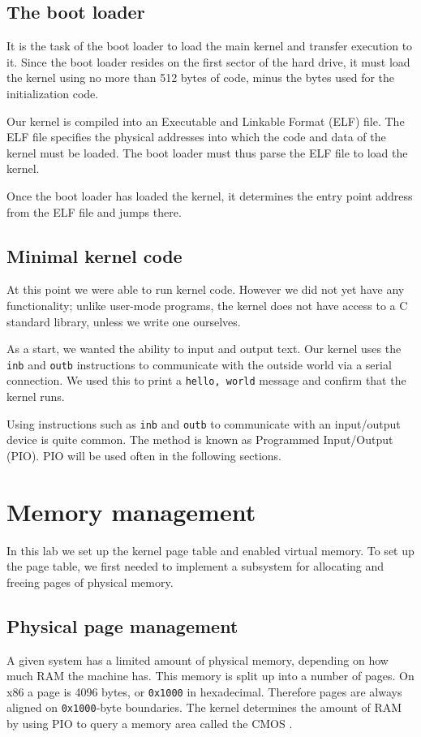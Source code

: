 \documentclass{report}
\begin{document}
\section{The boot loader}
It is the task of the boot loader to load the main kernel and transfer
execution to it. Since the boot loader resides on the first sector of the hard
drive, it must load the kernel using no more than 512 bytes of code, minus the
bytes used for the initialization code.

Our kernel is compiled into an Executable and Linkable Format (ELF) file. The
ELF file specifies the physical addresses into which the code and data of the
kernel must be loaded. The boot loader must thus parse the ELF file to load
the kernel.

Once the boot loader has loaded the kernel, it determines the entry point
address from the ELF file and jumps there.


\section{Minimal kernel code}
At this point we were able to run kernel code. However we did not yet have any
functionality; unlike user-mode programs, the kernel does not have access to a
C standard library, unless we write one ourselves.

As a start, we wanted the ability to input and output text.
Our kernel uses the \texttt{inb} and \texttt{outb} instructions to
communicate with the outside world via a serial connection. We used this to
print a \texttt{hello, world} message and confirm that the kernel runs.

Using instructions such as \texttt{inb} and \texttt{outb} to communicate with
an input/output device is quite common. The method is known as Programmed
Input/Output (PIO). PIO will be used often in the following sections.



\chapter{Memory management}
\label{sec:mem}
In this lab we set up the kernel page table and enabled virtual memory. To set up the
page table, we first needed to implement a subsystem for allocating and
freeing pages of physical memory.


\section{Physical page management}
A given system has a limited amount of physical memory, depending on how much
RAM the machine has. This memory is split up into a number of pages. On x86 a
page is 4096 bytes, or \texttt{0x1000} in hexadecimal. Therefore pages are always
aligned on \texttt{0x1000}-byte boundaries. The kernel determines the amount
of RAM by using PIO to query a memory area called the CMOS \cite{cmos}.
\end{document}
